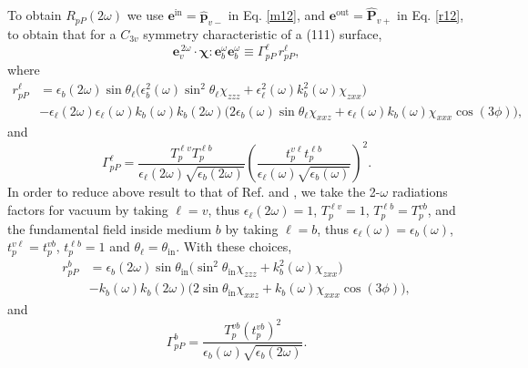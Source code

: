 \documentclass[10pt]{article}
\begin{document}
To obtain $R_{pP}(2\omega)$ we use
$\mathbf{e}^{\mathrm{in}}=\hat{\mathbf{p}}_{v-}$ in Eq. \eqref{m12}, and
$\mathbf{e}^{\mathrm{out}}=\hat{\mathbf{P}}_{v+}$ in Eq. \eqref{r12}, to obtain
that for a $C_{3v}$ symmetry characteristic of a (111) surface,
\begin{equation*}\label{m80}
\mathbf{e}^{\,2\omega}_{v}\cdot\boldsymbol{\chi}:
\mathbf{e}^\omega_{b}\mathbf{e}^\omega_{b}
\equiv\Gamma^{\ell}_{pP}\,r^{\ell}_{pP}
,
\end{equation*}
where
\begin{equation*}\label{m81}
\begin{split}
r^{\ell}_{pP} &=
\epsilon_{b}(2\omega)\sin\theta_{\ell}
\Big(
  \epsilon^2_{b}(\omega)\sin^2\theta_{\ell}\chi_{zzz}
+ \epsilon^2_{\ell}(\omega) k^2_{b}(\omega)\chi_{zxx}
\Big)\nonumber\\
&- \epsilon_{\ell}(2\omega)\epsilon_{\ell}(\omega)k_{b}(\omega)k_{b}(2\omega)
\Big(
  2\epsilon_{b}(\omega)\sin\theta_{\ell}\chi_{xxz}
+ \epsilon_{\ell}(\omega)k_{b}(\omega)\chi_{xxx}\cos(3\phi) 
\Big),
\end{split} 
\end{equation*}
and  
\begin{equation*}\label{m79}
\Gamma^{\ell}_{pP}=
\frac{T_{p}^{\ell v}T^{\ell b}_{p}}
     {\epsilon_{\ell}(2\omega)\sqrt{\epsilon_{b}(2\omega)}}
\left(
\frac{t_{p}^{v\ell}t^{\ell b}_{p}}
     {\epsilon_{\ell}(\omega)\sqrt{\epsilon_{b}(\omega)}}
\right)^{2} 
.  
\end{equation*} 
In order to reduce above result to that of Ref. \cite{mizrahiJOSA88} and
\cite{sipePRB87},  we take the 2-$\omega$ radiations factors for vacuum by
taking $\ell=v$, thus $\epsilon_{\ell}(2\omega)=1$, $T^{\ell v}_{p}=1$,
$T^{\ell b}_{p}=T^{vb}_{p}$, and the fundamental field inside medium $b$ by
taking $\ell=b$, thus $\epsilon_{\ell}(\omega)=\epsilon_{b}(\omega)$,
$t^{v\ell}_{p}=t^{vb}_{p}$, $t^{\ell b}_{p}=1$ and
$\theta_{\ell}=\theta_{\mathrm{in}}$. With these choices,
\begin{equation*}\label{m82}
\begin{split}
r^{b}_{pP}
&= \epsilon_{b}(2\omega)\sin\theta_{\mathrm{in}}
\Big(
\sin^2\theta_{\mathrm{in}}\chi_{zzz} + k^{2}_{b}(\omega)\chi_{zxx}
\Big)\nonumber\\
&- k_{b}(\omega)k_{b}(2\omega)
\Big(
2\sin\theta_{\mathrm{in}}\chi_{xxz} + k_{b}(\omega)\chi_{xxx}\cos(3\phi) 
\Big) 
,
\end{split}
\end{equation*}
and 
\begin{equation*}\label{m78}
\Gamma^b_{pP}
= \frac{T^{v b}_{p}(t^{vb}_{p})^2}
       {\epsilon_{b}(\omega)\sqrt{\epsilon_{b}(2\omega)}}
.
\end{equation*}
\end{document}
